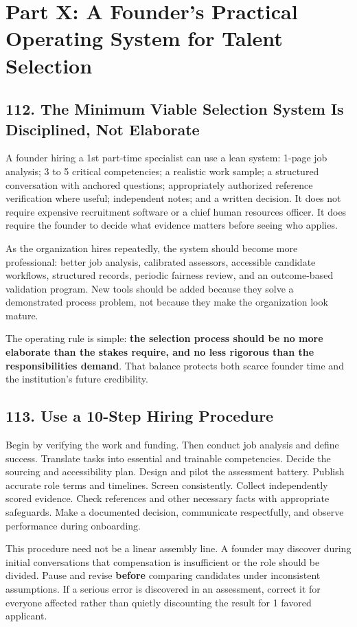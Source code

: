 \section*{Part X: A Founder's Practical Operating System for Talent Selection}

\subsection*{112. The Minimum Viable Selection System Is Disciplined, Not Elaborate}

A founder hiring a 1st part-time specialist can use a lean system: 1-page job analysis; 3 to 5 critical competencies; a realistic work sample; a structured conversation with anchored questions; appropriately authorized reference verification where useful; independent notes; and a written decision. It does not require expensive recruitment software or a chief human resources officer. It does require the founder to decide what evidence matters before seeing who applies.

As the organization hires repeatedly, the system should become more professional: better job analysis, calibrated assessors, accessible candidate workflows, structured records, periodic fairness review, and an outcome-based validation program. New tools should be added because they solve a demonstrated process problem, not because they make the organization look mature.

The operating rule is simple: \textbf{the selection process should be no more elaborate than the stakes require, and no less rigorous than the responsibilities demand}. That balance protects both scarce founder time and the institution's future credibility.

\subsection*{113. Use a 10-Step Hiring Procedure}

Begin by verifying the work and funding. Then conduct job analysis and define success. Translate tasks into essential and trainable competencies. Decide the sourcing and accessibility plan. Design and pilot the assessment battery. Publish accurate role terms and timelines. Screen consistently. Collect independently scored evidence. Check references and other necessary facts with appropriate safeguards. Make a documented decision, communicate respectfully, and observe performance during onboarding.

This procedure need not be a linear assembly line. A founder may discover during initial conversations that compensation is insufficient or the role should be divided. Pause and revise \textbf{before} comparing candidates under inconsistent assumptions. If a serious error is discovered in an assessment, correct it for everyone affected rather than quietly discounting the result for 1 favored applicant.

